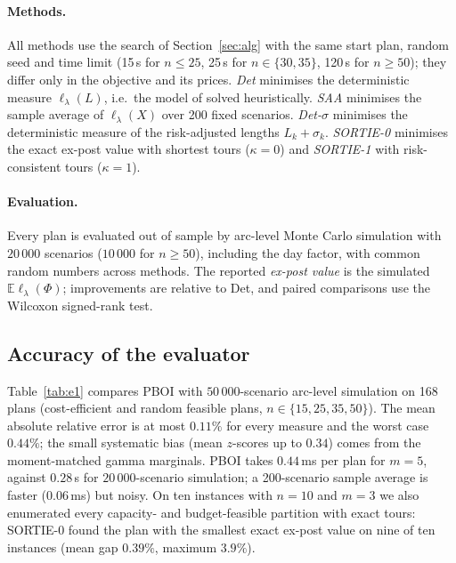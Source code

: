 \documentclass[11pt]{article}
\theoremstyle{definition}
\newcommand{\E}{\mathbb{E}}
\newcommand{\lord}{\ell_\lambda}
\begin{document}
\paragraph{Methods.} All methods use the search of Section~\ref{sec:alg} with
the same start plan, random seed and time limit (15\,s for $n\le25$, 25\,s for
$n\in\{30,35\}$, 120\,s for $n\ge50$); they differ only in the objective and its
prices. \emph{Det} minimises the deterministic measure $\lord(L)$, i.e.\ the
model of \citet{ljubic2026fair} solved heuristically. \emph{SAA} minimises the
sample average of $\lord(X)$ over 200 fixed scenarios. \emph{Det-$\sigma$}
minimises the deterministic measure of the risk-adjusted lengths $L_k+\sigma_k$.
\emph{SORTIE-0} minimises the exact ex-post value with shortest tours
($\kappa=0$) and \emph{SORTIE-1} with risk-consistent tours ($\kappa=1$).

\paragraph{Evaluation.} Every plan is evaluated out of sample by arc-level
Monte Carlo simulation with $20\,000$ scenarios ($10\,000$ for $n\ge 50$),
including the day factor, with common random numbers across methods. The
reported \emph{ex-post value} is the simulated $\E\lord(\Phi)$; improvements are
relative to Det, and paired comparisons use the Wilcoxon signed-rank test.

\subsection{Accuracy of the evaluator}\label{sec:exp:accuracy}
Table~\ref{tab:e1} compares PBOI with $50\,000$-scenario arc-level simulation
on 168 plans (cost-efficient and random feasible plans, $n\in\{15,25,35,50\}$).
The mean absolute relative error is at most $0.11\%$ for every measure and the
worst case $0.44\%$; the small systematic bias (mean $z$-scores up to $0.34$)
comes from the moment-matched gamma marginals. PBOI takes $0.44$\,ms per plan
for $m=5$, against $0.28$\,s for $20\,000$-scenario simulation; a 200-scenario
sample average is faster ($0.06$\,ms) but noisy. On ten instances with $n=10$
and $m=3$ we also enumerated every capacity- and budget-feasible partition
with exact tours: SORTIE-0 found the plan with the smallest exact ex-post value
on nine of ten instances (mean gap $0.39\%$, maximum $3.9\%$).

\begin{table}[t]\centering\small
\caption{Accuracy of PBOI against arc-level simulation ($50\,000$ scenarios)
on 168 plans; $z$: difference over its simulation standard error.}\label{tab:e1}

\end{table}
\end{document}
